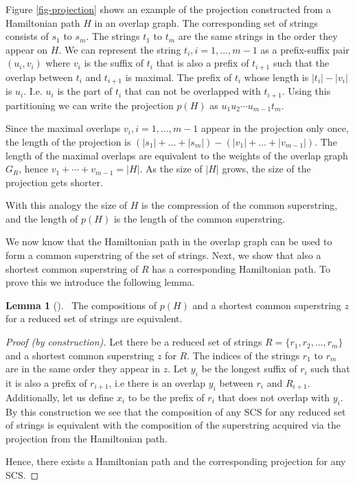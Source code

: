 \documentclass[english,twoside,censored,csm,algorithms-track-2020]{HYthesisML}
\theoremstyle{plain}
\theoremstyle{definition}
\newtheorem{lemma}[theorem]{Lemma}
\begin{document}


Figure \ref{fig-projection} shows an example of the projection constructed from a
Hamiltonian path $H$ in an overlap graph. The corresponding set of
strings consists of $s_1$ to $s_m$.
The strings $t_1$ to $t_m$ are the same strings in the order they appear on $H$.
We can represent the string $t_i, i=1,...,m-1$ as a prefix-suffix pair
$(u_i,v_i)$ where $v_i$ is the suffix of $t_i$ that is also a prefix of $t_{i+1}$ such that the
overlap between $t_i$ and $t_{i+1}$ is maximal. The prefix of $t_i$ whose length is $|t_i|-|v_i|$ is
$u_i$. I.e. $u_i$ is the part of $t_i$ that can not be overlapped with $t_{i+1}$. Using this
partitioning we can write the projection $p(H)$ as $u_1u_2\cdots u_{m-1}t_m$.

Since the maximal overlaps $v_i,i=1,...,m-1$ appear in the projection only once, the length of the
projection is $(|s_1|+...+|s_m|) - (|v_1|+...+|v_{m-1}|)$. The length of the maximal overlaps
are equivalent to the weights of the overlap graph $G_R$, hence $v_1+\cdots +v_{m-1} = |H|$. As the size
of $|H|$ grows, the size of the projection gets shorter.


With this analogy the size of $H$ is the compression of the common superstring,
and the length of $p(H)$ is the length of the common superstring.

We now know that the Hamiltonian path in the overlap graph can be used to form a common superstring
of the set of strings. Next, we show that also a shortest common superstring of $R$ has a
corresponding Hamiltonian path. To prove this we introduce the following lemma.


\begin{lemma}[]~\label{lem-composition}
The compositions of $p(H)$ and a shortest common superstring $z$ for a reduced set of strings are equivalent.
\end{lemma}
\begin{proof}[Proof (by construction)]
  Let there be a reduced set of strings $R=\{r_1,r_2,...,r_m\}$ and
  a shortest common superstring $z$ for $R$. The indices of the strings $r_1$ to $r_m$ are in the same
  order they appear in $z$. Let $y_i$ be the longest suffix of $r_i$ such that it is also a prefix
  of $r_{i+1}$, i.e there is an overlap $y_i$ between $r_i$ and $R_{i+1}$. Additionally, let us
  define $x_i$ to be the prefix of $r_i$ that does not overlap with $y_i$. By this construction we
  see that the composition of any SCS for any reduced set of strings is equivalent with the composition
  of the superstring acquired via the projection from the Hamiltonian path.

  Hence, there exists a
  Hamiltonian path and the corresponding projection for any SCS.
\end{proof}
\end{document}
